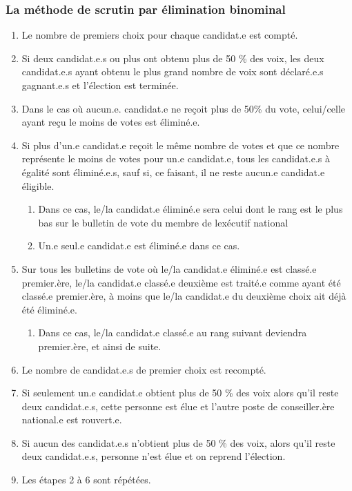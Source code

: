 \subsubsection{La méthode de scrutin par élimination binominal}
\label{la-methode-de-scrutin-par-elimination-binominal}

\begin{enumerate}
 \item
  Le nombre de premiers choix pour chaque candidat.e est compté.
 \item
  Si deux candidat.e.s ou plus ont obtenu plus de 50 \% des voix, les deux candidat.e.s ayant obtenu le plus grand nombre de voix sont déclaré.e.s gagnant.e.s et l'élection est terminée.
 \item
  Dans le cas où aucun.e. candidat.e ne reçoit plus de 50\% du vote, celui/celle ayant reçu le moins de votes est éliminé.e.
 \item
  Si plus d'un.e candidat.e reçoit le même nombre de votes et que ce nombre représente le moins de votes pour un.e candidat.e, tous les candidat.e.s à égalité sont éliminé.e.s, sauf si, ce faisant, il ne reste aucun.e candidat.e éligible.

  \begin{enumerate}
   \item
    Dans ce cas, le/la candidat.e éliminé.e sera celui dont le rang est le plus bas sur le bulletin de vote du membre de l\textquotesingle exécutif national
   \item
    Un.e seul.e candidat.e est éliminé.e dans ce cas.
  \end{enumerate}
 \item
  Sur tous les bulletins de vote où le/la candidat.e éliminé.e est classé.e premier.ère, le/la candidat.e classé.e deuxième est traité.e comme ayant été classé.e premier.ère, à moins que le/la candidat.e du deuxième choix ait déjà été éliminé.e.

  \begin{enumerate}
   \item
    Dans ce cas, le/la candidat.e classé.e au rang suivant deviendra premier.ère, et ainsi de suite.
  \end{enumerate}
 \item
  Le nombre de candidat.e.s de premier choix est recompté.
 \item
  Si seulement un.e candidat.e obtient plus de 50 \% des voix alors qu'il reste deux candidat.e.s, cette personne est élue et l'autre poste de conseiller.ère national.e est rouvert.e.
 \item
  Si aucun des candidat.e.s n'obtient plus de 50 \% des voix, alors qu'il reste deux candidat.e.s, personne n'est élue et on reprend l'élection.
 \item
  Les étapes 2 à 6 sont répétées.
\end{enumerate}


